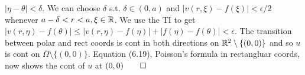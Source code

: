 $|\eta - \theta| < \delta$. We can choose $\delta$ s.t. $\delta \in (0, a)$ and $|v(r, \xi) - f(\xi)| < \epsilon/2$ whenever $a-\delta < r< a, \xi \in \mathbb{R}$. We use the TI to get $|v(r, \eta) - f(\theta)| \leq |v(r, \eta) - f(\eta)| + | f(\eta) - f(\theta)| < \epsilon.$  The transition between polar and rect coords is cont in both directions on $\mathbb{R}^2 \setminus \{(0,0)\}$ and so $u$ is cont on $\bar{\Omega} \setminus \{(0,0)\}$.  Equation (6.19), Poisson's formula in rectangluar coords, now shows the cont of $u$ at $(0, 0) \qed$ 
